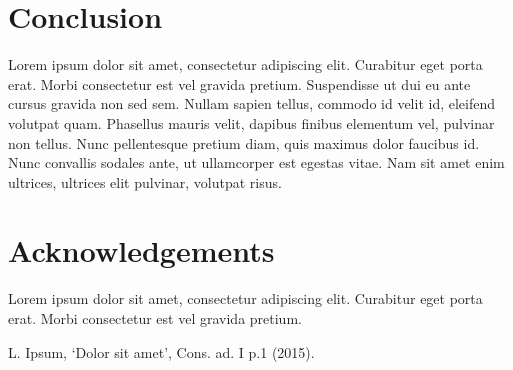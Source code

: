 \documentclass[10pt]{article}
\begin{document}
\begin{multicols}{2}
\section{Conclusion}
Lorem ipsum dolor sit amet, consectetur adipiscing elit. Curabitur eget porta erat. Morbi consectetur est vel gravida pretium. Suspendisse ut dui eu ante cursus gravida non sed sem. Nullam sapien tellus, commodo id velit id, eleifend volutpat quam. Phasellus mauris velit, dapibus finibus elementum vel, pulvinar non tellus. Nunc pellentesque pretium diam, quis maximus dolor faucibus id. Nunc convallis sodales ante, ut ullamcorper est egestas vitae. Nam sit amet enim ultrices, ultrices elit pulvinar, volutpat risus.

\section*{Acknowledgements}
Lorem ipsum dolor sit amet, consectetur adipiscing elit. Curabitur eget porta erat. Morbi consectetur est vel gravida pretium. 


\nolinenumbers

\begin{thebibliography}{99}
 L. Ipsum, `Dolor sit amet', Cons. ad. I p.1 (2015).
\end{thebibliography}

\end{multicols}
\end{document}
